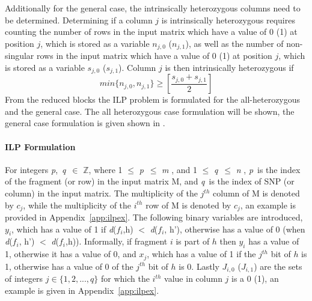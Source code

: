 \documentclass[10pt,twocolumn]{article}
\newcommand{\M}{\textit{m }}
\newcommand{\N}{\textit{n }}
\newcommand{\D}{\textit{d}}
\newcommand{\PP}{\textit{p}}
\newcommand{\QQ}{\textit{q}}
\begin{document}
Additionally for the general case, the intrinsically heterozygous columns need to be determined. 
Determining if a column $j$ is intrinsically heterozygous requires counting the number of rows in the input matrix which
have a value of 0 (1) at position $j$, which is stored as a variable $n_{j,0}$ ($n_{j,1}$), as well as the
number of non-singular rows in the input matrix which have a value of 0 (1) at position $j$, which is stored
as a variable $s_{j,0}$ ($s_{j,1}$). Column $j$ is then intrinsically heterozygous if
\begin{equation*}
    min\{n_{j,0},n_{j,1}\} \ge \left[ \frac{s_{j,0} + s_{j,1}}{2} \right]
\end{equation*}
From the reduced blocks the ILP problem is formulated for the all-heterozygous and the general case. The
all heterozygous case formulation will be shown, the general case formulation is given shown in
\cite{sup:2013}. 

\paragraph{ILP Formulation} \label{ssec:ilpform}

For integers \PP,\ \QQ\ $\in$ $\mathbb{Z}$, where 1 $\le$ \PP\ $\le$ \M, and 1 $\le$ \QQ\ $\le$ \N, \PP\ is the 
index of the fragment (or row) in the input matrix M, and \QQ\ is the index of SNP (or column) in the input 
matrix. The multiplicity of the $j^{th}$ column of M is denoted by $c_j$, while the multiplicity of the
$i^{th}$ row of M is denoted by $c_j$, an example is provided in Appendix~\ref{app:ilpex}. The following 
binary variables are introduced, $y_i$, which has a value of 1 if \D($f_i$,h) $<$ \D($f_i$, h'), otherwise 
has a value of 0 (when \D($f_i$, h') $<$ \D($f_i$,h)). Informally, if fragment $i$ is part of $h$ then $y_i$ 
has a value of 1, otherwise it has a value of 0, and $x_j$, which has a value of 1 if the $j^{th}$ bit of 
$h$ is 1, otherwise has a value of 0 of the $j^{th}$ bit of $h$ is 0. 
Lastly $J_{i,0}$ ($J_{i,1}$) are the sets of integers $j \in \{1,2,...,q\}$ for which 
the $i^{th}$ value in column $j$ is a 0 (1), an example is given in Appendix~\ref{app:ilpex}.
\end{document}
